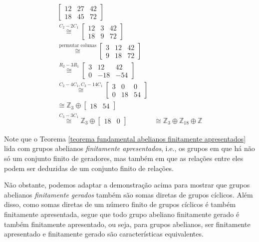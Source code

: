 \begin{align*}
	\begin{bmatrix}
	12 & 27 & 42 \\
	18 & 45 & 72
	\end{bmatrix}& \\ \stackrel{C_2 - 2C_1}{\cong}
	\begin{bmatrix}
	12 & 3 & 42 \\
	18 & 9 & 72
	\end{bmatrix}& \\ \stackrel{\text{permutar colunas}}{\cong}
	\begin{bmatrix}
	3 & 12 & 42 \\
	9 & 18 & 72
	\end{bmatrix}& \\ \stackrel{R_2 - 3R_1}{\cong}
	\begin{bmatrix}
	3 & 12 & 42 \\
	0 & -18 & -54
	\end{bmatrix}& \\ \stackrel{C_2 - 4C_1, C_3 - 14C_1}{\cong}
	\begin{bmatrix}
	3 & 0 & 0 \\
	0 & 18 & 54
	\end{bmatrix}& \\ \stackrel{}{\cong}
	\mathbb{Z}_3\oplus\begin{bmatrix}
	18 & 54
	\end{bmatrix}& \\ \stackrel{C_3 - 3C_1}{\cong}
	\mathbb{Z}_3\oplus\begin{bmatrix}
	18 & 0
	\end{bmatrix}& \cong \mathbb{Z}_3\oplus\mathbb{Z}_{18}\oplus\mathbb{Z}
	\end{align*}
	\par\vspace{0.3cm} Note que o Teorema \eqref{teorema fundamental abelianos finitamente apresentados} lida com grupos abelianos \textit{finitamente apresentados}, i.e., os grupos em que há não só um conjunto finito de geradores, mas também em que as relações entre eles podem ser deduzidas de um conjunto finito de relações.
	\par\vspace{0.3cm} Não obstante, podemos adaptar a demonstração acima para mostrar que grupos abelianos \textit{finitamente gerados} também são somas diretas de grupos cíclicos. Além disso, como somas diretas de um número finito de grupos cíclicos é também finitamente apresentada, segue que todo grupo abeliano finitamente gerado é também finitamente apresentado, ou seja, para grupos abelianos, ser finitamente apresentado e finitamente gerado são características equivalentes.
